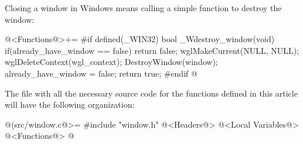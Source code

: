 
Closing a window in Windows means calling a simple function to destroy
the window:

\iniciocodigo
@<Functions@>+=
#if defined(_WIN32)
bool _Wdestroy_window(void){
  if(already_have_window == false)
    return false;
  wglMakeCurrent(NULL, NULL);
  wglDeleteContext(wgl_context);
  DestroyWindow(window);
  already_have_window = false;
  return true;
}
#endif
@
\fimcodigo



The file with all the necessary source code for the functions defined
in this article will have the following organization:

\iniciocodigo
@(src/window.c@>=
#include "window.h"
@<Headers@>
@<Local Variables@>
@<Functions@>
@
\fimcodigo


\fim
